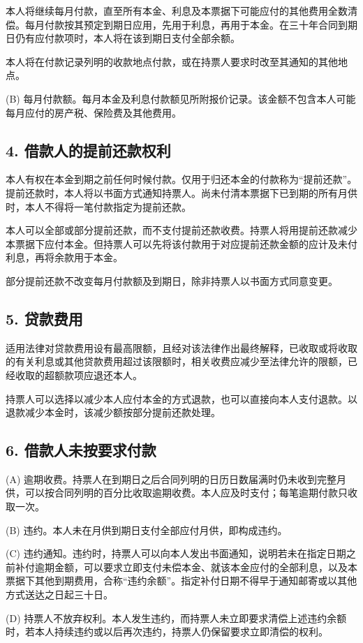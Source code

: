 \documentclass[UTF8,fontset=none,11pt,a4paper]{ctexart}
\begin{document}
本人将继续每月付款，直至所有本金、利息及本票据下可能应付的其他费用全数清偿。每月付款按其预定到期日应用，先用于利息，再用于本金。在三十年合同到期日仍有应付款项时，本人将在该到期日支付全部余额。


本人将在付款记录列明的收款地点付款，或在持票人要求时改至其通知的其他地点。


(B) 每月付款额。每月本金及利息付款额见所附报价记录。该金额不包含本人可能每月应付的房产税、保险费及其他费用。


\subsection*{4. 借款人的提前还款权利}
本人有权在本金到期之前任何时候付款。仅用于归还本金的付款称为“提前还款”。提前还款时，本人将以书面方式通知持票人。尚未付清本票据下已到期的所有月供时，本人不得将一笔付款指定为提前还款。


本人可以全部或部分提前还款，而不支付提前还款收费。持票人将用提前还款减少本票据下应付本金。但持票人可以先将该付款用于对应提前还款金额的应计及未付利息，再将余款用于本金。


部分提前还款不改变每月付款额及到期日，除非持票人以书面方式同意变更。


\subsection*{5. 贷款费用}
适用法律对贷款费用设有最高限额，且经对该法律作出最终解释，已收取或将收取的有关利息或其他贷款费用超过该限额时，相关收费应减少至法律允许的限额，已经收取的超额款项应退还本人。


持票人可以选择以减少本人应付本金的方式退款，也可以直接向本人支付退款。以退款减少本金时，该减少额按部分提前还款处理。


\subsection*{6. 借款人未按要求付款}
(A) 逾期收费。持票人在到期日之后合同列明的日历日数届满时仍未收到完整月供，可以按合同列明的百分比收取逾期收费。本人应及时支付；每笔逾期付款只收取一次。


(B) 违约。本人未在月供到期日支付全部应付月供，即构成违约。


(C) 违约通知。违约时，持票人可以向本人发出书面通知，说明若未在指定日期之前补付逾期金额，可以要求立即支付未偿本金、就该本金应付的全部利息，以及本票据下其他到期费用，合称“违约余额”。指定补付日期不得早于通知邮寄或以其他方式送达之日起三十日。


(D) 持票人不放弃权利。本人发生违约，而持票人未立即要求清偿上述违约余额时，若本人持续违约或以后再次违约，持票人仍保留要求立即清偿的权利。
\end{document}
